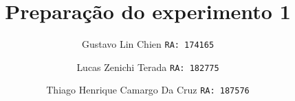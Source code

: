 \documentclass[report]{zentera}
\title{Preparação do experimento 1}
\author{Gustavo Lin Chien \texttt{RA: 174165} \and Lucas Zenichi Terada \texttt{RA: 182775} \and Thiago Henrique Camargo Da Cruz \texttt{RA: 187576}}
\begin{document}
\makeheader
\end{document}
